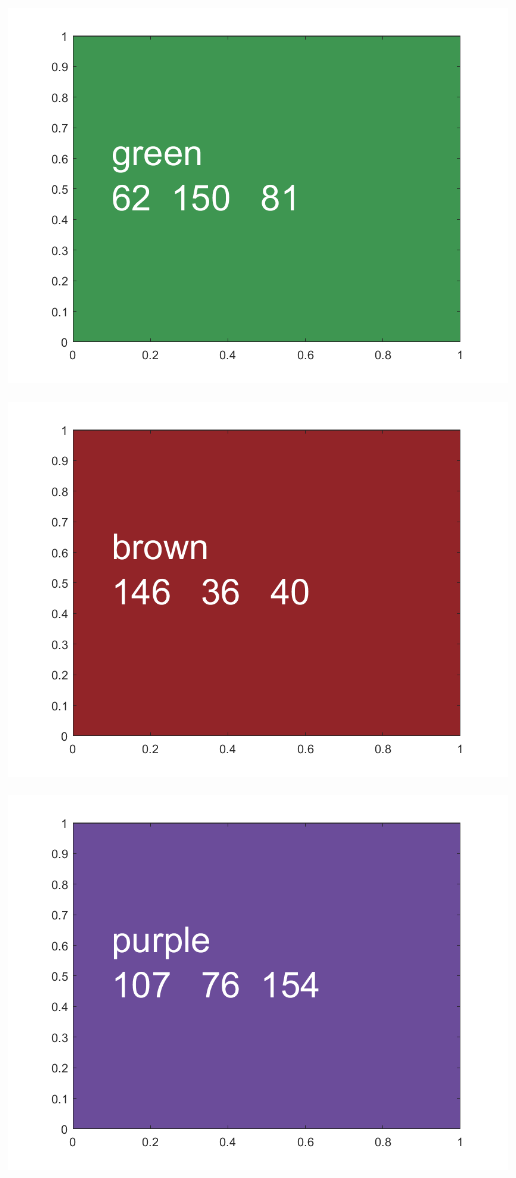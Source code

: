 \documentclass[
]{book}
\begin{document}
\includegraphics[width=5.20833in,height=\textheight]{img/fs_color_images/figure_3.png}

\includegraphics[width=5.20833in,height=\textheight]{img/fs_color_images/figure_4.png}

\includegraphics[width=5.20833in,height=\textheight]{img/fs_color_images/figure_5.png}
\end{document}
